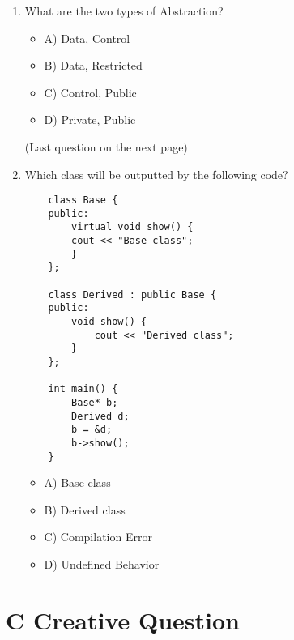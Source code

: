 \documentclass[a4paper,12pt]{article}
\begin{document}
\begin{enumerate}
    \item What are the two types of Abstraction?
    \begin{itemize}
        \item A) Data, Control
        \item B) Data, Restricted
        \item C) Control, Public
        \item D) Private, Public
    \end{itemize}

\begin{center}
    (Last question on the next page)
\end{center}

    \newpage

    \item Which class will be outputted by the following code?

    \lstset{language=C}
    \begin{lstlisting}
    class Base {
    public:
        virtual void show() {
        cout << "Base class";
        }
    };

    class Derived : public Base {
    public:
        void show() {
            cout << "Derived class";
        }
    };

    int main() {
        Base* b;
        Derived d;
        b = &d;
        b->show();
    }
    \end{lstlisting}

    \begin{itemize}
        \item A) Base class
        \item B) Derived class
        \item C) Compilation Error
        \item D) Undefined Behavior
    \end{itemize}
    
\end{enumerate}

\newpage

\section{C Creative Question}
\end{document}
